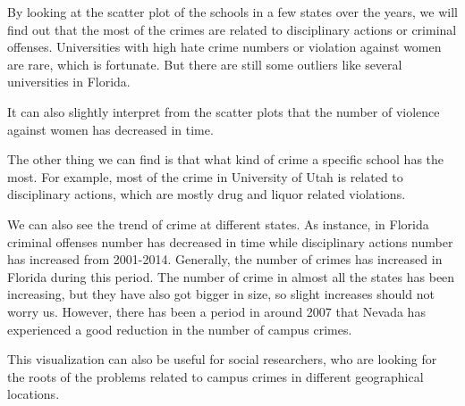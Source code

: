 \documentclass[12pt]{article}
\begin{document}
By looking at the scatter plot of the schools in a few states over the years, we will find out that the most of the crimes are related to disciplinary actions or criminal offenses. Universities with high hate crime numbers or violation against women are rare, which is fortunate. But there are still some outliers like several universities in Florida.

It can also slightly interpret from the scatter plots that the number of violence against women has decreased in time. 

The other thing we can find is that what kind of crime a specific school has the most. For example, most of the crime in University of Utah is related to disciplinary actions, which are mostly drug and liquor related violations. 

We can also see the trend of crime at different states. As instance, in Florida criminal offenses number has decreased in time while disciplinary actions number has increased from 2001-2014. Generally, the number of crimes has increased in Florida during this period. The number of crime in almost all the states has been increasing, but they have also got bigger in size, so slight increases should not worry us. However, there has been a period in around 2007 that Nevada has experienced a good reduction in the number of campus crimes.

This visualization can also be useful for social researchers, who are looking for the roots of the problems related to campus crimes in different geographical locations.

 

\end{document}
